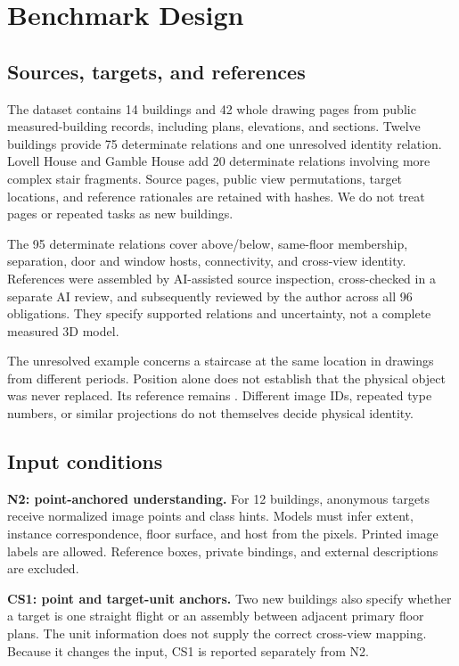 \section{Benchmark Design}
\label{sec:benchmark}



\subsection{Sources, targets, and references}
The dataset contains 14 buildings and 42 whole drawing pages from public
measured-building records, including plans, elevations, and sections.
Twelve buildings provide 75 determinate relations and one unresolved
identity relation. Lovell House and Gamble House add 20 determinate
relations involving more complex stair fragments. Source pages, public
view permutations, target locations, and reference rationales are retained
with hashes. We do not treat pages or repeated tasks as new buildings.

The 95 determinate relations cover above/below, same-floor membership,
separation, door and window hosts, connectivity, and cross-view identity.
References were assembled by AI-assisted source inspection, cross-checked
in a separate AI review, and subsequently reviewed by the author across
all 96 obligations. They specify supported relations and uncertainty, not
a complete measured 3D model.

The unresolved example concerns a staircase at the same location in
drawings from different periods. Position alone does not establish that
the physical object was never replaced. Its reference remains \unk{}.
Different image IDs, repeated type numbers, or similar projections do
not themselves decide physical identity.

\subsection{Input conditions}
\textbf{N2: point-anchored understanding.}
For 12 buildings, anonymous targets receive normalized image points and
class hints. Models must infer extent, instance correspondence, floor
surface, and host from the pixels. Printed image labels are allowed.
Reference boxes, private bindings, and external descriptions are excluded.

\textbf{CS1: point and target-unit anchors.}
Two new buildings also specify whether a target is one straight flight
or an assembly between adjacent primary floor plans. The unit information
does not supply the correct cross-view mapping. Because it changes the
input, CS1 is reported separately from N2.

